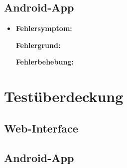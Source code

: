 \documentclass[a4paper]{scrreprt}
\begin{document}
		  \section{Android-App}
		
			  \begin{itemize}
				  \item \textbf{Fehlersymptom:}
				  	\par \textbf{Fehlergrund:}
			  		\par \textbf{Fehlerbehebung:}
			  \end{itemize}
			
			
		\newpage
		\chapter{Test\"uberdeckung}
			\section{Web-Interface}
			
			
			\section{Android-App}
\end{document}
